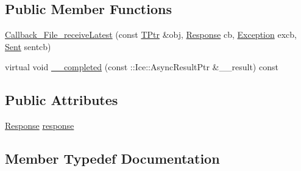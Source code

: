 \subsection*{Public Member Functions}
\begin{DoxyCompactItemize}
\item 
\hyperlink{class_file_system_1_1_callback___file__receive_latest_adbf315f6067917f59867ccb1b4257ea8}{Callback\+\_\+\+File\+\_\+receive\+Latest} (const \hyperlink{class_file_system_1_1_callback___file__receive_latest_a8e2064ea01933278c4d3a63cb101d0ce}{T\+Ptr} \&obj, \hyperlink{class_file_system_1_1_callback___file__receive_latest_a5bf96c59afd76cc204ef4d42fa6527af}{Response} cb, \hyperlink{class_file_system_1_1_callback___file__receive_latest_acc747c11c007fbee3d60c5d85affbe4e}{Exception} excb, \hyperlink{class_file_system_1_1_callback___file__receive_latest_a3a1aaa5cad2e6bb47fd5706274b3afa3}{Sent} sentcb)
\item 
virtual void \hyperlink{class_file_system_1_1_callback___file__receive_latest_a266149ea3d3f15cfff0b2130f0b08b52}{\+\_\+\+\_\+completed} (const \+::Ice\+::\+Async\+Result\+Ptr \&\+\_\+\+\_\+result) const 
\end{DoxyCompactItemize}
\subsection*{Public Attributes}
\begin{DoxyCompactItemize}
\item 
\hyperlink{class_file_system_1_1_callback___file__receive_latest_a5bf96c59afd76cc204ef4d42fa6527af}{Response} \hyperlink{class_file_system_1_1_callback___file__receive_latest_a9433217018ef8fde59f9ccc202b461f1}{response}
\end{DoxyCompactItemize}


\subsection{Member Typedef Documentation}
\hypertarget{class_file_system_1_1_callback___file__receive_latest_acc747c11c007fbee3d60c5d85affbe4e}{}
